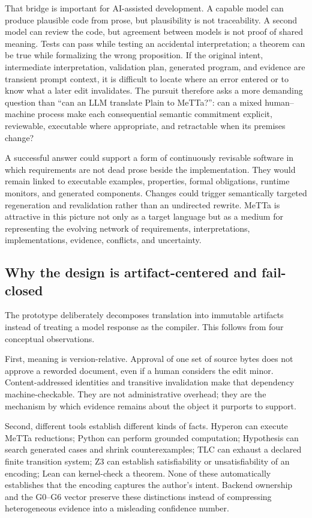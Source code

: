 \documentclass[11pt]{article}
\begin{document}
That bridge is important for AI-assisted development.  A capable model can
produce plausible code from prose, but plausibility is not traceability.  A
second model can review the code, but agreement between models is not proof of
shared meaning.  Tests can pass while testing an accidental interpretation;
a theorem can be true while formalizing the wrong proposition.  If the
original intent, intermediate interpretation, validation plan, generated
program, and evidence are transient prompt context, it is difficult to locate
where an error entered or to know what a later edit invalidates.  The pursuit
therefore asks a more demanding question than ``can an LLM translate Plain to
MeTTa?'': can a mixed human--machine process make each consequential semantic
commitment explicit, reviewable, executable where appropriate, and
retractable when its premises change?

A successful answer could support a form of continuously revisable software
in which requirements are not dead prose beside the implementation.  They
would remain linked to executable examples, properties, formal obligations,
runtime monitors, and generated components.  Changes could trigger
semantically targeted regeneration and revalidation rather than an undirected
rewrite.  MeTTa is attractive in this picture not only as a target language
but as a medium for representing the evolving network of requirements,
interpretations, implementations, evidence, conflicts, and uncertainty.

\subsection{Why the design is artifact-centered and fail-closed}

The prototype deliberately decomposes translation into immutable artifacts
instead of treating a model response as the compiler.  This follows from
four conceptual observations.

First, meaning is version-relative.  Approval of one set of source bytes does
not approve a reworded document, even if a human considers the edit minor.
Content-addressed identities and transitive invalidation make that dependency
machine-checkable.  They are not administrative overhead; they are the
mechanism by which evidence remains about the object it purports to support.

Second, different tools establish different kinds of facts.  Hyperon can
execute MeTTa reductions; Python can perform grounded computation; Hypothesis
can search generated cases and shrink counterexamples; TLC can exhaust a
declared finite transition system; Z3 can establish satisfiability or
unsatisfiability of an encoding; Lean can kernel-check a theorem.  None of
these automatically establishes that the encoding captures the author's
intent.  Backend ownership and the G0--G6 vector preserve these distinctions
instead of compressing heterogeneous evidence into a misleading confidence
number.
\end{document}
